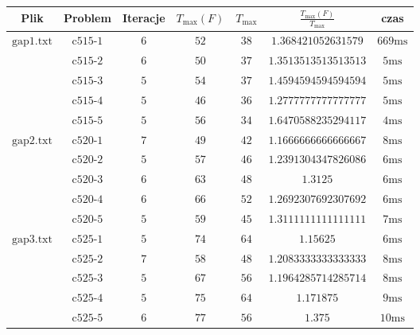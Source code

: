 \begin{tabular}{ccccccc}
    Plik              & Problem         & Iteracje & $T_{\max}(F)$ & $T_{\max}$ & $ \frac{T_{\max}(F)}{T_{\max}} $ & czas           \\ \hline
    $\text{gap1.txt}$ & $\text{c515-1}$ & $6$      & $52$          & $38$       & $1.368421052631579$              & $\text{669ms}$ \\
     & $\text{c515-2}$ & $6$      & $50$          & $37$       & $1.3513513513513513$             & $\text{5ms}$   \\
     & $\text{c515-3}$ & $5$      & $54$          & $37$       & $1.4594594594594594$             & $\text{5ms}$   \\
     & $\text{c515-4}$ & $5$      & $46$          & $36$       & $1.2777777777777777$             & $\text{5ms}$   \\
     & $\text{c515-5}$ & $5$      & $56$          & $34$       & $1.6470588235294117$             & $\text{4ms}$   \\  \hline
    $\text{gap2.txt}$ & $\text{c520-1}$ & $7$      & $49$          & $42$       & $1.1666666666666667$             & $\text{8ms}$   \\
     & $\text{c520-2}$ & $5$      & $57$          & $46$       & $1.2391304347826086$             & $\text{6ms}$   \\
     & $\text{c520-3}$ & $6$      & $63$          & $48$       & $1.3125$                         & $\text{6ms}$   \\
     & $\text{c520-4}$ & $6$      & $66$          & $52$       & $1.2692307692307692$             & $\text{6ms}$   \\
     & $\text{c520-5}$ & $5$      & $59$          & $45$       & $1.3111111111111111$             & $\text{7ms}$   \\ \hline
    $\text{gap3.txt}$ & $\text{c525-1}$ & $5$      & $74$          & $64$       & $1.15625$                        & $\text{6ms}$   \\
     & $\text{c525-2}$ & $7$      & $58$          & $48$       & $1.2083333333333333$             & $\text{8ms}$   \\
     & $\text{c525-3}$ & $5$      & $67$          & $56$       & $1.1964285714285714$             & $\text{8ms}$   \\
     & $\text{c525-4}$ & $5$      & $75$          & $64$       & $1.171875$                       & $\text{9ms}$   \\
     & $\text{c525-5}$ & $6$      & $77$          & $56$       & $1.375$                          & $\text{10ms}$  \\ \hline

\end{tabular}

